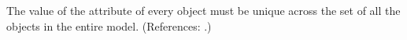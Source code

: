 The value of the attribute  of every \UnitDefinition object must
be unique across the set of all the \UnitDefinition objects in the entire
model.  (References: .)
